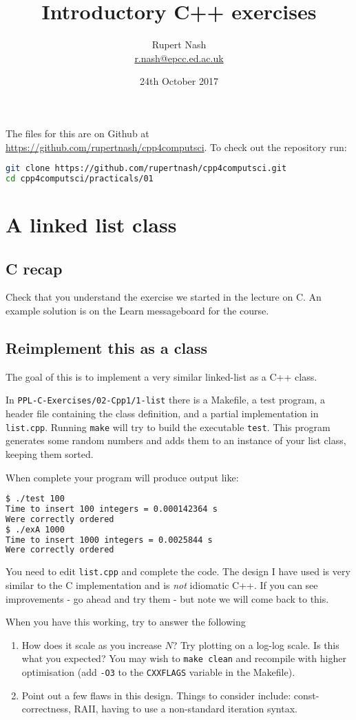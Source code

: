 \documentclass{article}
\title{Introductory C++ exercises}
\author{Rupert Nash \\ \url{r.nash@epcc.ed.ac.uk}}
\date{24th October 2017}
\newcommand{\code}[1]{\lstinline!#1!}
\newcommand{\fn}[1]{\texttt{#1}}
\begin{document}
\maketitle{}

The files for this are on Github at \url{https://github.com/rupertnash/cpp4computsci}. To check out the repository run:
\begin{lstlisting}[language=bash]
git clone https://github.com/rupertnash/cpp4computsci.git
cd cpp4computsci/practicals/01
\end{lstlisting}

\section{A linked list class}

\subsection{C recap}
Check that you understand the exercise we started in the lecture on
C. An example solution is on the Learn messageboard for the course.

\subsection{Reimplement this as a class}
The goal of this is to implement a very similar linked-list as a C++
class.

In \fn{PPL-C-Exercises/02-Cpp1/1-list} there is a Makefile, a test
program, a header file containing the class definition, and a partial
implementation in \fn{list.cpp}. Running \code{make} will try to build
the executable \fn{test}. This program generates some random numbers
and adds them to an instance of your list class, keeping them sorted.

When complete your program will produce output like:
\begin{lstlisting}[language=bash]
$ ./test 100
Time to insert 100 integers = 0.000142364 s
Were correctly ordered
$ ./exA 1000
Time to insert 1000 integers = 0.0025844 s
Were correctly ordered
\end{lstlisting}

You need to edit \fn{list.cpp} and complete the code. The design I
have used is very similar to the C implementation and is \emph{not}
idiomatic C++. If you can see improvements - go ahead and try them -
but note we will come back to this.

When you have this working, try to answer the following
\begin{enumerate}
\item How does it scale as you increase $N$? Try plotting on a log-log
  scale. Is this what you expected? You may wish to \code{make clean}
  and recompile with higher optimisation (add \fn{-O3} to the
  \code{CXXFLAGS} variable in the Makefile).

\item Point out a few flaws in this design. Things to consider
  include: const-correctness, RAII, having to use a non-standard
  iteration syntax.

\end{enumerate}
\end{document}
